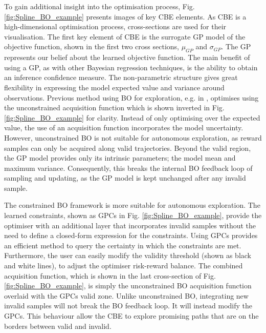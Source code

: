 \documentclass[shortAfour,sageh,times]{sagej_no_sage}
\begin{document}
To gain additional insight into the optimisation process, Fig. \ref{fig:Spline_BO_example} presents images of key CBE elements. As CBE is a high-dimensional optimisation process, cross-sections are used for their visualisation. The first key element of CBE is the surrogate GP model of the objective function, shown in the first two cross sections, $\mu_{GP}$ and $\sigma_{GP}$. The GP represents our belief about the learned objective function. The main benefit of using a GP, as with other Bayesian regression techniques, is the ability to obtain an inference confidence measure. The non-parametric structure gives great flexibility in expressing the model expected value and variance around observations. Previous method using BO for exploration, e.g. in  \citep{Martinez-Cantin2009}, optimises using the unconstrained acquisition function which is shown inverted in Fig. \ref{fig:Spline_BO_example} for clarity. Instead of only optimising over the expected value, the use of an acquisition function incorporates the model uncertainty. However, unconstrained BO is not suitable for autonomous exploration, as reward samples can only be acquired along valid trajectories. Beyond the valid region, the GP model provides only its intrinsic parameters; the model mean and maximum variance. Consequently, this breaks the internal BO feedback loop of sampling and updating, as the GP model is kept unchanged after any invalid sample. 

The constrained BO framework is more suitable for autonomous exploration. The learned constraints, shown as GPCs in Fig. \ref{fig:Spline_BO_example}, provide the optimiser with an additional layer that incorporates invalid samples without the need to define a closed-form expression for the constraints. Using GPCs provides an efficient method to query the certainty in which the constraints are met. Furthermore, the user can easily modify the validity threshold (shown as black and white lines), to adjust the optimiser risk-reward balance. The combined acquisition function, which is shown in the last cross-section of Fig. \ref{fig:Spline_BO_example}, is simply the unconstrained BO acquisition function overlaid with the GPCs valid zone. Unlike unconstrained BO, integrating new invalid samples will not break the BO feedback loop. It will instead modify the GPCs. This behaviour allow the CBE to explore promising paths that are on the borders between valid and invalid.
\end{document}
